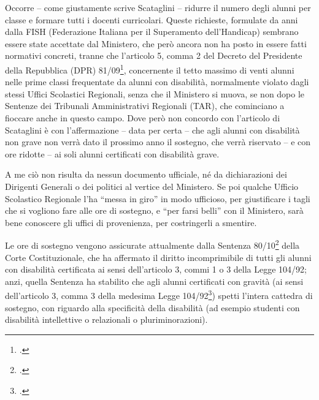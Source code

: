 Occorre – come giustamente scrive Scataglini – ridurre il numero degli alunni per classe e formare tutti i docenti curricolari. Queste richieste, formulate da anni dalla FISH (Federazione Italiana per il Superamento dell'Handicap) sembrano essere state accettate dal Ministero, che però ancora non ha posto in essere fatti normativi concreti, tranne che l'articolo 5, comma 2 del Decreto del Presidente della Repubblica (DPR) 81/09\footcite{DPR_81_2009}, concernente il tetto massimo di venti alunni nelle prime classi frequentate da alunni con disabilità, normalmente violato dagli stessi Uffici Scolastici Regionali, senza che il Ministero si muova, se non dopo le Sentenze dei Tribunali Amministrativi Regionali (TAR), che cominciano a fioccare anche in questo campo.
Dove però non concordo con l'articolo di Scataglini è con l'affermazione – data per certa – che agli alunni con disabilità non grave non verrà dato il prossimo anno il sostegno, che verrà riservato – e con ore ridotte – ai soli alunni certificati con disabilità grave.

A me ciò non risulta da nessun documento ufficiale, né da dichiarazioni dei Dirigenti Generali o dei politici al vertice del Ministero. Se poi qualche Ufficio Scolastico Regionale l'ha “messa in giro” in modo ufficioso, per giustificare i tagli che si vogliono fare alle ore di sostegno, e “per farsi belli” con il Ministero, sarà bene conoscere gli uffici di provenienza, per costringerli a smentire.

Le ore di sostegno vengono assicurate attualmente dalla Sentenza 80/10\footcite{SCC_80_2010} della Corte Costituzionale, che ha affermato il diritto incomprimibile di tutti gli alunni con disabilità certificata ai sensi dell'articolo 3, commi 1 o 3 della Legge 104/92; anzi, quella Sentenza ha stabilito che agli alunni certificati con gravità (ai sensi dell'articolo 3, comma 3 della medesima Legge 104/92\footcite{Legge_104_92}) spetti l'intera cattedra di sostegno, con riguardo alla specificità della disabilità (ad esempio studenti con disabilità intellettive o relazionali o pluriminorazioni).

